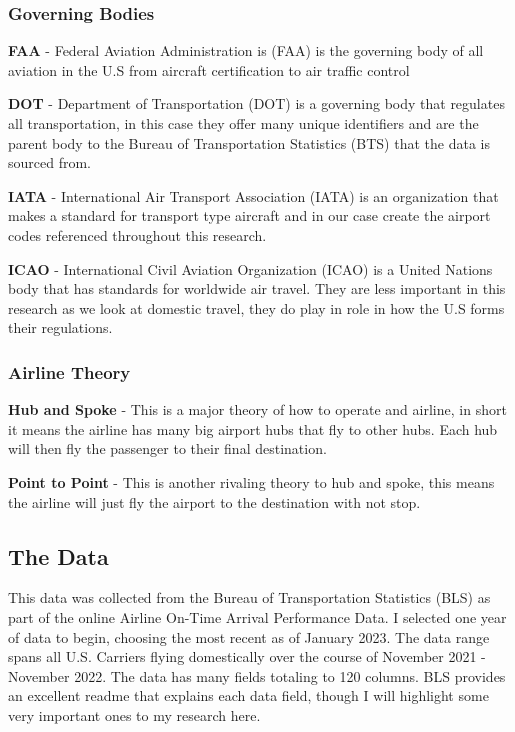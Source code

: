 \documentclass[a4paper,12pt]{article}
\begin{document}
\subsubsection{Governing Bodies}
\noindent \textbf{FAA} - Federal Aviation Administration is (FAA) is the governing body of all aviation in the U.S from aircraft certification to air traffic control

\noindent \textbf{DOT} - Department of Transportation (DOT) is a governing body that regulates all transportation, in this case they offer many unique identifiers 
and are the parent body to the Bureau of Transportation Statistics (BTS) that the data is sourced from.

\noindent \textbf{IATA} - International Air Transport Association (IATA) is an organization that makes a standard for transport type aircraft and in our case create the airport codes referenced
throughout this research. 

\noindent \textbf{ICAO} - International Civil Aviation Organization (ICAO) is a United Nations body that has standards for worldwide air travel. They are less important in this research as we look at domestic travel,
they do play in role in how the U.S forms their regulations.

\subsubsection{Airline Theory}

\textbf{Hub and Spoke} - This is a major theory of how to operate and airline, in short it means the airline has many big airport hubs that fly to other hubs.
Each hub will then fly the passenger to their final destination.

\noindent \textbf{Point to Point} - This is another rivaling theory to hub and spoke, this means the airline will just fly the airport to the destination with not stop.

\subsection{The Data} \label{data}
This data was collected from the Bureau of Transportation Statistics (BLS) as part of the online Airline On-Time Arrival Performance Data. 
I selected one year of data to begin, choosing the most recent as of January 2023. The data range spans all U.S. Carriers flying domestically over the course of November 2021 - November 2022.
The data has many fields totaling to 120 columns. BLS provides an excellent readme that explains each data field, though I will highlight some very important ones to my research here.
\end{document}
